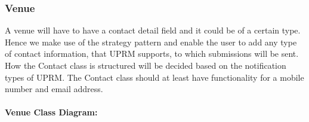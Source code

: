 \subsubsection{Venue}
A venue will have to have a contact detail field and it could be of a certain type. Hence we make use of the strategy pattern and enable the user to add any type of contact information, that UPRM supports, to which submissions will be sent. How the Contact class is structured will be decided based on the notification types of UPRM. The Contact class should at least have functionality for a mobile number and email address.\\ \\
\textbf{Venue Class Diagram:}\\
\centerline{}